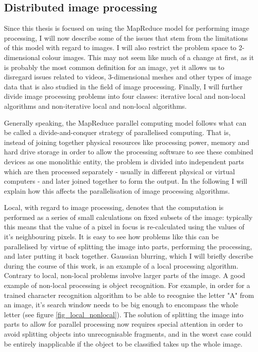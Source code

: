 \documentclass [12pt,a4paper]{report}
\begin{document}
\subsection{Distributed image processing}

Since this thesis is focused on using the MapReduce model for performing image processing, I will now describe some of the issues that stem from the limitations of this model with regard to images. I will also restrict the problem space to 2-dimensional colour images. This may not seem like much of a change at first, as it is probably the most common definition for an image, yet it allows us to disregard issues related to videos, 3-dimensional meshes and other types of image data that is also studied in the field of image processing. Finally, I will further divide image processing problems into four classes: iterative local and non-local algorithms and non-iterative local and non-local algorithms.

Generally speaking, the MapReduce parallel computing model follows what can be called a divide-and-conquer strategy of parallelised computing. That is, instead of joining together physical resources like processing power, memory and hard drive storage in order to allow the processing software to see these combined devices as one monolithic entity, the problem is divided into independent parts which are then processed separately - usually in different physical or virtual computers - and later joined together to form the output. In the following I will explain how this affects the parallelisation of image processing algorithms.

Local, with regard to image processing, denotes that the computation is performed as a series of small calculations on fixed subsets of the image: typically this means that the value of a pixel in focus is re-calculated using the values of it's neighbouring pixels. It is easy to see how problems like this can be parallelised by virtue of splitting the image into parts, performing the processing, and later putting it back together. Gaussian blurring, which I will briefly describe during the course of this work, is an example of a local processing algorithm. Contrary to local, non-local problems involve larger parts of the image. A good example of non-local processing is object recognition. For example, in order for a trained character recognition algorithm to be able to recognise the letter "A" from an image, it's search window needs to be big enough to encompass the whole letter (see figure \ref{fig_local_nonlocal}). The solution of splitting the image into parts to allow for parallel processing now requires special attention in order to avoid splitting objects into unrecognisable fragments, and in the worst case could be entirely inapplicable if the object to be classified takes up the whole image.
\end{document}
